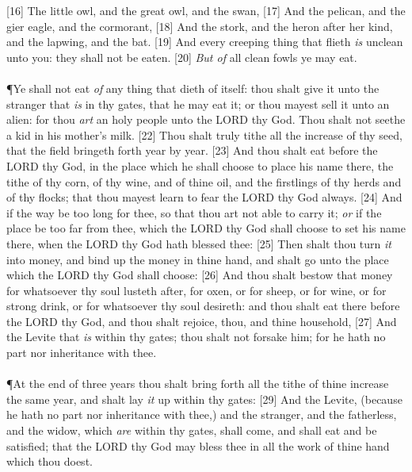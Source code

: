 [16] \textcolor[rgb]{0.00,0.00,1.00}{The little owl, and the great owl, and the swan,}
[17] \textcolor[rgb]{0.00,0.00,1.00}{And the pelican, and the gier eagle, and the cormorant,}
[18] \textcolor[rgb]{0.00,0.00,1.00}{And the stork, and the heron after her kind, and the lapwing, and the bat.}
[19] \textcolor[rgb]{0.00,0.00,1.00}{And every creeping thing that flieth \emph{is} unclean unto you: they shall not be eaten.}
[20] \textcolor[rgb]{0.00,0.00,1.00}{\emph{But of} all clean fowls ye may eat.}\\
\\
\P \textcolor[rgb]{0.00,0.00,1.00}{Ye shall not eat \emph{of} any thing that dieth of itself: thou shalt give it unto the stranger that \emph{is} in thy gates, that he may eat it; or thou mayest sell it unto an alien: for thou \emph{art} an holy people unto the LORD thy God. Thou shalt not seethe a kid in his mother's milk.}
[22] \textcolor[rgb]{0.00,0.00,1.00}{Thou shalt truly tithe all the increase of thy seed, that the field bringeth forth year by year.}
[23] \textcolor[rgb]{0.00,0.00,1.00}{And thou shalt eat before the LORD thy God, in the place which he shall choose to place his name there, the tithe of thy corn, of thy wine, and of thine oil, and the firstlings of thy herds and of thy flocks; that thou mayest learn to fear the LORD thy God always.}
[24] \textcolor[rgb]{0.00,0.00,1.00}{And if the way be too long for thee, so that thou art not able to carry it; \emph{or} if the place be too far from thee, which the LORD thy God shall choose to set his name there, when the LORD thy God hath blessed thee:}
[25] \textcolor[rgb]{0.00,0.00,1.00}{Then shalt thou turn \emph{it} into money, and bind up the money in thine hand, and shalt go unto the place which the LORD thy God shall choose:}
[26] \textcolor[rgb]{0.00,0.00,1.00}{And thou shalt bestow that money for whatsoever thy soul lusteth after, for oxen, or for sheep, or for wine, or for strong drink, or for whatsoever thy soul desireth: and thou shalt eat there before the LORD thy God, and thou shalt rejoice, thou, and thine household,}
[27] \textcolor[rgb]{0.00,0.00,1.00}{And the Levite that \emph{is} within thy gates; thou shalt not forsake him; for he hath no part nor inheritance with thee.}\\
\\
\P \textcolor[rgb]{0.00,0.00,1.00}{At the end of three years thou shalt bring forth all the tithe of thine increase the same year, and shalt lay \emph{it} up within thy gates:}
[29] \textcolor[rgb]{0.00,0.00,1.00}{And the Levite, (because he hath no part nor inheritance with thee,) and the stranger, and the fatherless, and the widow, which \emph{are} within thy gates, shall come, and shall eat and be satisfied; that the LORD thy God may bless thee in all the work of thine hand which thou doest.}
\newpage
